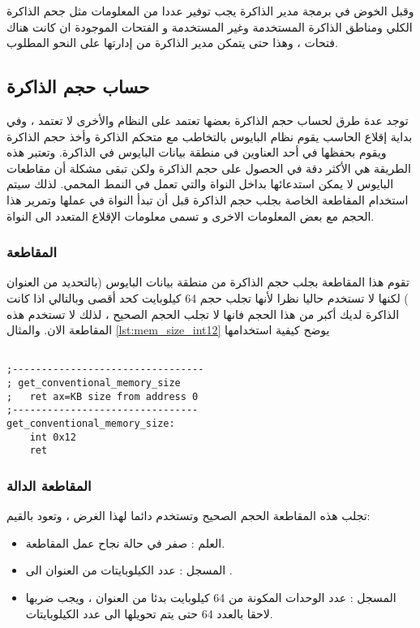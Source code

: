 \documentclass[document.tex]{subfiles}
\begin{document}
وقبل الخوض في برمجة مدير الذاكرة يجب توفير عددا من المعلومات مثل جحم الذاكرة الكلي ومناطق الذاكرة المستخدمة وغير المستخدمة و الفتحات الموجودة ان كانت هناك فتحات ، وهذا حتى يتمكن مدير الذاكرة من إدارتها على النحو المطلوب. 
 
\subsection{حساب حجم الذاكرة}
توجد عدة طرق لحساب حجم الذاكرة بعضها تعتمد على النظام والأخرى لا تعتمد ، وفي بداية إقلاع الحاسب يقوم نظام البايوس بالتخاطب مع متحكم الذاكرة وأخذ حجم الذاكرة ويقوم بحفظها في أحد العناوين في منطقة بيانات البايوس في الذاكرة. وتعتبر هذه الطريقة هي الأكثر دقة في الحصول على حجم الذاكرة ولكن تبقى مشكلة أن مقاطعات البايوس لا يمكن استدعائها بداخل النواة والتي تعمل في النمط المحمي. لذلك سيتم استخدام المقاطعة الخاصة بجلب حجم الذاكرة قبل أن تبدأ النواة في عملها وتمرير هذا الحجم مع بعض المعلومات الاخرى و تسمى معلومات الإقلاع المتعدد الى النواة. 

\subsubsection{المقاطعة }
تقوم هذا المقاطعة بجلب حجم الذاكرة من منطقة بيانات البايوس (بالتحديد من العنوان ) لكنها لا تستخدم حاليا نظرا لأنها تجلب حجم  64 كيلوبايت كحد أقصى وبالتالي اذا كانت الذاكرة لديك أكبر من هذا الحجم فانها لا تجلب الحجم الصحيح ، لذلك لا تستخدم هذه المقاطعة الان. والمثال \ref{lst:mem_size_int12} يوضح كيفية استخدامها 

\begin{english}
\lstset{numberstyle=\tiny,numbers=left,stepnumber=1,numbersep=5pt,tabsize=2,extendedchars=true,breaklines=true,frame=b,showspaces=false, showtabs=false,xleftmargin=10pt,framexleftmargin=10pt,framexrightmargin=5pt,framexbottommargin=4pt,showstringspaces=false,language=[x86masm]Assembler}

\begin{lstlisting}[label=lst:mem_size_int12,caption=\en{Using int 0x12 to get size of memory}]

;---------------------------------
; get_conventional_memory_size
;	ret ax=KB size from address 0
;--------------------------------
get_conventional_memory_size:
	int 0x12
	ret

\end{lstlisting}
\end{english}
 
\subsubsection{المقاطعة  الدالة }
تجلب هذه المقاطعة الحجم الصحيح وتستخدم دائما لهذا الغرض ، وتعود بالقيم:
\begin{itemize}
\item العلم : صفر في حالة نجاح عمل المقاطعة.
\item المسجل : عدد الكيلوبايتات من العنوان  الى .
\item المسجل : عدد الوحدات المكونة من 64 كيلوبايت بدئا من العنوان ، ويجب ضربها لاحقا بالعدد 64 حتى يتم تحويلها الى عدد الكيلوبايتات.
\end{itemize}
\end{document}
